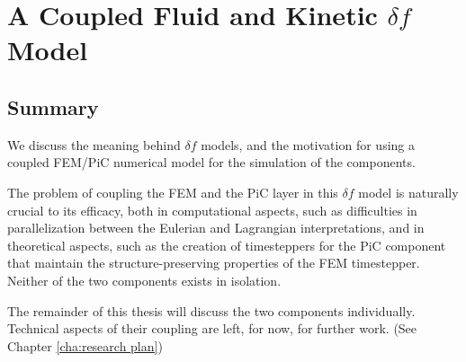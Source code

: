 \chapter{A Coupled Fluid and Kinetic $\delta\!f$ Model}\label{cha:delta f corrections}
    

    
    


    \section*{Summary}
        We discuss the meaning behind $\delta\!f$ models, and the motivation for using a coupled FEM/PiC numerical model for the simulation of the components.
        
        The problem of coupling the FEM and the PiC layer in this $\delta\!f$ model is naturally crucial to its efficacy, both in computational aspects, such as difficulties in parallelization between the Eulerian and Lagrangian interpretations, and in theoretical aspects, such as the creation of timesteppers for the PiC component that maintain the structure-preserving properties of the FEM timestepper. Neither of the two components exists in isolation.
        
        The remainder of this thesis will discuss the two components individually. Technical aspects of their coupling are left, for now, for further work. (See Chapter \ref{cha:research plan})
    